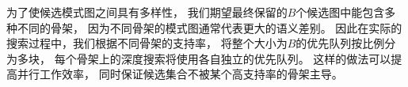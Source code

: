 %


为了使候选模式图之间具有多样性，
我们期望最终保留的$B$个候选图中能包含多种不同的骨架，
因为不同骨架的模式图通常代表更大的语义差别。
因此在实际的搜索过程中，我们根据不同骨架的支持率，
将整个大小为$B$的优先队列按比例分为多块，
每个骨架上的深度搜索将使用各自独立的优先队列。
这样的做法可以提高并行工作效率，
同时保证候选集合不被某个高支持率的骨架主导。

